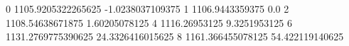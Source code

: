 0 1105.9205322265625 -1.0238037109375
1 1106.9443359375 0.0
2 1108.54638671875 1.60205078125
4 1116.26953125 9.3251953125
6 1131.2769775390625 24.3326416015625
8 1161.366455078125 54.422119140625
